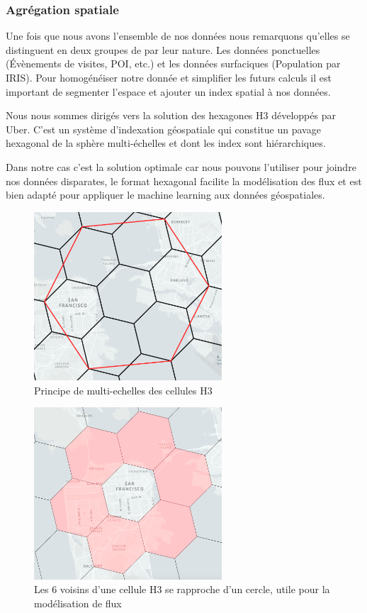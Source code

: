 \subsubsection{Agrégation spatiale}

Une fois que nous avons l'ensemble de nos données nous remarquons qu'elles se distinguent en deux groupes de par leur nature. Les données ponctuelles (\'Evènements de visites, POI, etc.) et les données surfaciques (Population par IRIS). Pour homogénéiser notre donnée et simplifier les futurs calculs il est important de segmenter l'espace et ajouter un index spatial à nos données.

Nous nous sommes dirigés vers la solution des hexagones H3 \cite{Uber_H3} développés par Uber. C'est un système d'indexation géospatiale qui constitue un pavage hexagonal de la sphère multi-échelles et dont les index sont hiérarchiques.

Dans notre cas c'est la solution optimale car nous pouvons l'utiliser pour joindre nos données disparates, le format hexagonal facilite la modélisation des flux et est bien adapté pour appliquer le machine learning aux données géospatiales.


\begin{figure}[H]
    \centering
    \includegraphics[width=7cm]{images/graphs/h3-multiscale.png}
    \caption{Principe de multi-echelles des cellules H3}
    \label{fig:celluleh3}
\end{figure}

\begin{figure}[H]
    \centering
    \includegraphics[width=7cm]{images/graphs/h3-ring.png}
    \captionsetup{justification=centering}
    \caption{Les 6 voisins d'une cellule H3 se rapproche d'un cercle, utile pour la modélisation de flux}
    \label{fig:celluleh3ring}
\end{figure}

